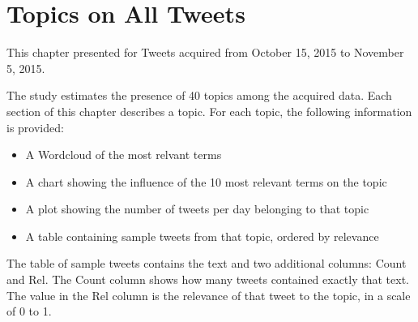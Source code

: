 \chapter{Topics on All Tweets}

This chapter presented for Tweets acquired from October 15, 2015 to November 5, 2015.

The study estimates the presence of 40 topics among the acquired data. Each section of this chapter describes a topic. For each topic, the following information is provided:

\begin{itemize}
\item A Wordcloud of the most relvant terms
\item A chart showing the influence of the 10 most relevant terms on the topic
\item A plot showing the number of tweets per day belonging to that topic
\item A table containing sample tweets from that topic, ordered by relevance
\end{itemize}

The table of sample tweets contains the text and two additional columns: Count and Rel. The Count column shows how many tweets contained exactly that text. The value in the Rel column is the relevance of that tweet to the topic, in a scale of 0 to 1.

